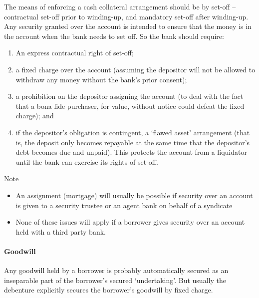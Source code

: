\documentclass[
]{article}
\providecommand{\tightlist}{%
  \setlength{\itemsep}{0pt}\setlength{\parskip}{0pt}}
\newenvironment{env-486fc4cd-eb32-4215-aaa2-fc77a67eebc5}
{
    \savenotes\tcolorbox[blanker,breakable,left=5pt,borderline west={2pt}{-4pt}{blue}]
}
{
    \endtcolorbox\spewnotes
}
\begin{document}
The means of enforcing a cash collateral arrangement should be by
set-off -- contractual set-off prior to winding-up, and mandatory
set-off after winding-up. Any security granted over the account is
intended to ensure that the money is in the account when the bank needs
to set off. So the bank should require:

\begin{enumerate}
\tightlist
\item
  An express contractual right of set-off;
\item
  a fixed charge over the account (assuming the depositor will not be
  allowed to withdraw any money without the bank's prior consent);
\item
  a prohibition on the depositor assigning the account (to deal with the
  fact that a bona fide purchaser, for value, without notice could
  defeat the fixed charge); and
\item
  if the depositor's obligation is contingent, a `flawed asset'
  arrangement (that is, the deposit only becomes repayable at the same
  time that the depositor's debt becomes due and unpaid). This protects
  the account from a liquidator until the bank can exercise its rights
  of set-off.
\end{enumerate}

\begin{env-486fc4cd-eb32-4215-aaa2-fc77a67eebc5}

Note

\begin{itemize}
\tightlist
\item
  An assignment (mortgage) will usually be possible if security over an
  account is given to a security trustee or an agent bank on behalf of a
  syndicate
\item
  None of these issues will apply if a borrower gives security over an
  account held with a third party bank.
\end{itemize}

\end{env-486fc4cd-eb32-4215-aaa2-fc77a67eebc5}

\hypertarget{goodwill}{%
\paragraph{Goodwill}\label{goodwill}}

Any goodwill held by a borrower is probably automatically secured as an
inseparable part of the borrower's secured `undertaking'. But usually
the debenture explicitly secures the borrower's goodwill by fixed
charge.
\end{document}
